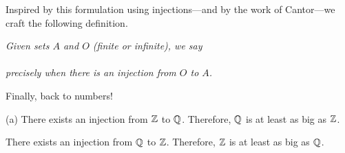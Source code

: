 \medskip

Inspired by this formulation using injections---and by the work of
Cantor---we craft the following definition.

\noindent
{\em
Given sets $A$ and $O$ (finite or infinite), we say \\
\hspace*{.35in}{\em Set $O$ is at least as big as set $A$} \\
precisely when there is an injection from $O$ to $A$.}

\medskip

Finally, back to numbers!


\begin{prop}
\label{thm:|Q|=|Z|}
{\rm (a)} There exists an injection from $\mathbb{Z}$ to $\mathbb{Q}$.  Therefore,
$\mathbb{Q}$ is at least as big as $\mathbb{Z}$.

 There exists an injection from $\mathbb{Q}$ to $\mathbb{Z}$.
Therefore, $\mathbb{Z}$ is at least as big as $\mathbb{Q}$.
\end{prop}

